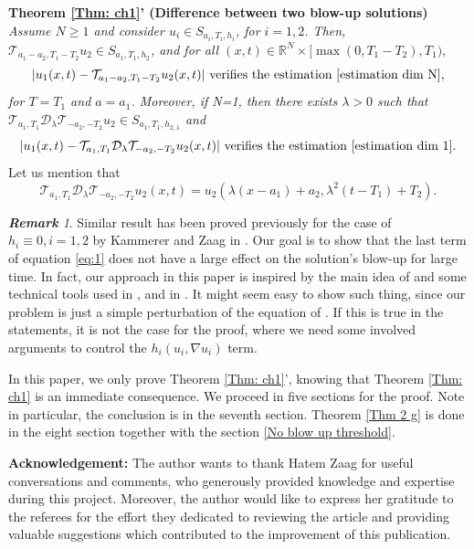 \documentclass[11pt,a4paper]{article}
\newcommand{\1}{\mathbbm{1}}
\numberwithin{equation}{section}
\newcommand{\numberset}{\mathbb}
\newcommand{\R}{\numberset{R}}
\theoremstyle{remark}
\newtheorem*{remark}{\textbf{Remark}}
\begin{document}
\noindent \textbf{Theorem \ref{Thm: ch1}' (Difference between two blow-up solutions)}
\textit{Assume $N\geq 1$ and consider $u_i\in S_{a_i,T_i,h_i}$, for $i=1,2$. Then, $\mathcal{T}_{a_1-a_2,T_1-T_2}u_2\in S_{a_1,T_1,h_2}$, and for all $(x,t)\in \R^N\times [\max(0,T_1-T_2), T_1)$}, 
\begin{equation}\label{thm estimation dim N}
|u_1(x,t)-\mathcal{T}_{a_1-a_2,T_1-T_2}u_2(x,t)| \text{ verifies the estimation \eqref{estimation dim N}},
\end{equation}
\textit{for $T=T_1$ and $a=a_1$. Moreover, if N=1, then there exists $\lambda>0$ such that $\mathcal{T}_{a_1,T_1}\mathcal{D}_\lambda \mathcal{T}_{-a_2,-T_2} u_2\in S_{a_1,T_1,h_{2,\lambda}}$ and }
\begin{equation}\label{thm estimation dim 1}
|u_1(x,t)-\mathcal{T}_{a_1,T_1}\mathcal{D}_\lambda \mathcal{T}_{-a_2,-T_2} u_2(x,t)| \text{ verifies the estimation \eqref{estimation dim 1}}.
\end{equation}
Let us mention that
\begin{equation}
    \mathcal{T}_{a_1,T_1}\mathcal{D}_\lambda \mathcal{T}_{-a_2,-T_2} u_2(x,t)=u_2(\lambda(x-a_1)+a_2,\lambda^2(t-T_1)+T_2).
\end{equation}

\begin{remark}
    Similar result has been proved previously for the case of $h_i\equiv 0, i=1,2$ by Kammerer and Zaag in \cite{KZ2000}. Our goal is to show that the last term of equation \eqref{eq:1} does not have a large effect on the solution's blow-up  for large time. In fact, our approach in this paper is inspired by the main idea of \cite{KZ2000} and some technical tools used in \cite{GK1989}, \cite{TZ2015} and in \cite{AZ2021}. It might seem easy to show such thing, since our problem is just a simple perturbation of the equation of \cite{KZ2000}. If this is true in the statements, it is not the case for the proof, where we need some involved arguments to control the $h_i(u_i, \nabla u_i)$ term.
\end{remark}

In this paper, we only prove Theorem \ref{Thm: ch1}', knowing that Theorem \ref{Thm: ch1} is an immediate consequence. We proceed in five sections for the proof. Note in particular, the conclusion is in the seventh section. Theorem \ref{Thm 2 g} is done in the eight section together with the section \ref{No blow up threshold}.

\textbf{Acknowledgement:} The author wants to thank Hatem Zaag for useful conversations and comments, who generously provided knowledge and expertise during this project.
Moreover, the author would like to express her gratitude to the referees for the effort they dedicated to reviewing the article and providing valuable suggestions which contributed to the improvement of this publication.
\end{document}
